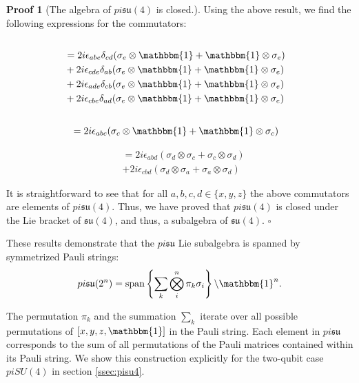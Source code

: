 \documentclass[%
 reprint,
 amsmath,amssymb,
 aps,
]{revtex4-2}
\theoremstyle{definition}%
\newtheorem{proof2}{Proof}[section]
\begin{document}
\begin{proof2}[The algebra of $pi\mathfrak{su}(4)$ is closed.]
Using the above result, we find the following expressions for the commutators:
\begin{align*}
     [(\sigma_a \otimes \sigma_c + \sigma_c \otimes \sigma_a), &(\sigma_b \otimes \sigma_d + \sigma_d \otimes \sigma_b)]\\
    &=2 i \epsilon_{abe} \delta_{cd}(\sigma_e \otimes \mathbbm{1} + \mathbbm{1} \otimes \sigma_e) \\
    &+2 i \epsilon_{cde} \delta_{ab}(\sigma_e \otimes \mathbbm{1} + \mathbbm{1} \otimes \sigma_e) \\
    &+2 i \epsilon_{ade} \delta_{cb}(\sigma_e \otimes \mathbbm{1} + \mathbbm{1} \otimes \sigma_e) \\
    &+2 i \epsilon_{cbe} \delta_{ad}(\sigma_e \otimes \mathbbm{1} 
    + \mathbbm{1} \otimes \sigma_e)
\end{align*}
\begin{align*}
    [(\sigma_a \otimes \mathbbm{1} + \mathbbm{1} \otimes \sigma_a), &(\sigma_b \otimes \mathbbm{1} + \mathbbm{1} \otimes \sigma_b)]\\
    & = 2i \epsilon_{abc}(\sigma_c \otimes \mathbbm{1} + \mathbbm{1} \otimes \sigma_c)
\end{align*}
\begin{align*}
[(\sigma_a \otimes \sigma_c + \sigma_c \otimes \sigma_a),&(\sigma_b \otimes \mathbbm{1}
+ \mathbbm{1} \otimes \sigma_b) ]\\
&=2 i \epsilon_{abd}(\sigma_d \otimes \sigma_c + \sigma_c \otimes \sigma_d)\\
&+2 i \epsilon_{cbd}(\sigma_d \otimes \sigma_a + \sigma_a \otimes \sigma_d)
\end{align*}

It is straightforward to see that for all $a,b,c,d \in \{x,y,z\}$ the above commutators are elements of $pi\mathfrak{su}(4)$.  Thus, we have proved that $pi\mathfrak{su}(4)$ is closed under the Lie bracket of $\mathfrak{su}(4)$, and thus, a subalgebra of $\mathfrak{su}(4)$.
\hfill $\square$
\end{proof2}


These results demonstrate that the $pi\mathfrak{su}$ Lie subalgebra is spanned by symmetrized Pauli strings:
\begin{equation}
pi\mathfrak{su}(2^n) = \operatorname{span}\left\{ \sum_k \bigotimes_i^n\pi_k\sigma_i\right\}\backslash \mathbbm{1}^n.
\end{equation}

The permutation $\pi_k$ and the summation $\sum_k$ iterate over all possible permutations of $[x, y, z, \mathbbm{1}]$ in the Pauli string. Each element in $pi\mathfrak{su}$ corresponds to the sum of all permutations of the Pauli matrices contained within its Pauli string. We show this construction explicitly for the two-qubit case $piSU(4)$ in section \ref{ssec:pisu4}.
\end{document}
